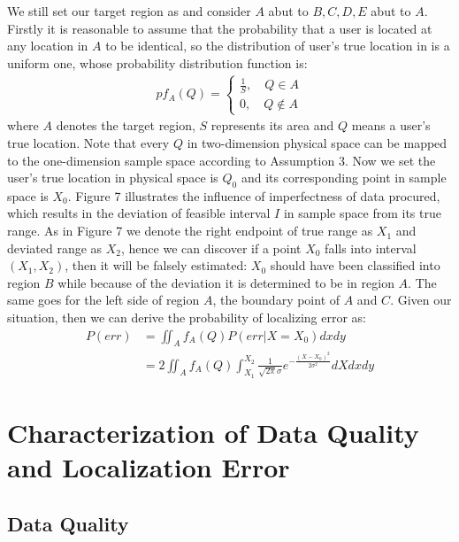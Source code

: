 \documentclass[journal]{IEEEtran}
\begin{document}
We still set our target region as  and consider $A$ abut to $B, C, D, E$ abut to $A$. Firstly it is reasonable to assume that the probability that a user is located at any location in $A$ to be identical, so the distribution of user's true location in  is a uniform one, whose probability distribution function is:
\begin{align}
p{f_A}(Q) = \left\{ \begin{array}{l}
\frac{1}{S},\quad Q \in A\\
0,\quad Q \notin A
\end{array} \right.
\end{align}
where $A$ denotes the target region, $S$ represents its area and $Q$ means a user's true location. Note that every $Q$ in two-dimension physical space can be mapped to the one-dimension sample space according to Assumption 3. Now we set the user's true location in physical space is ${Q_0}$ and its corresponding point in sample space is $X_0$. Figure 7 illustrates the influence of imperfectness of data procured, which results in the deviation of feasible interval $I$ in sample space from its true range. As in Figure 7 we denote the right endpoint of true range as $X_1$ and deviated range as $X_2$, hence we can discover if a point $X_0$  falls into interval $(X_1,X_2)$, then it will be falsely estimated: $X_0$ should have been classified into region $B$ while because of the deviation it is determined to be in region $A$. The same goes for the left side of region $A$, the boundary point of $A$ and $C$. Given our situation, then we can derive the probability of localizing error as:
\begin{align}
P(err) &= \iint_A {{f_A}}(Q)P(err|X = {X_0})dxdy\\
&= 2\iint_A {{f_A}}(Q)\int_{{X_1}}^{{X_2}} {\frac{1}{{\sqrt {2\pi } \sigma }}{e^{ - \frac{{{{(X - {X_0})}^2}}}{{2{\sigma ^2}}}}}} dXdxdy
\end{align}










\section{Characterization of Data Quality and Localization Error}

\subsection{Data Quality}
\end{document}
